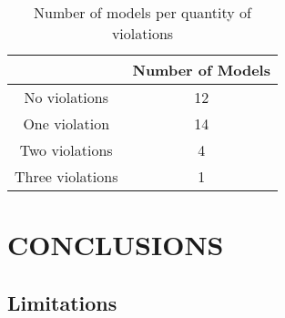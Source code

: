 \documentclass[a4paper,twoside]{article}
\begin{document}
\begin{table}[]
	\centering
	\caption{Number of models per quantity of violations}
	\label{ModelsPerQuantityOfViolation}
	\begin{tabular}{|c|c|}
		\hline
		& Number of Models \\ \hline
		No violations & 12 \\ \hline
		One violation & 14 \\ \hline
		Two violations & 4 \\ \hline
		Three violations & 1 \\ \hline
	\end{tabular}
\end{table}

\section{CONCLUSIONS}\label{Conclusion}

\noindent 
\subsection{Limitations}

\noindent 

%


\end{document}

